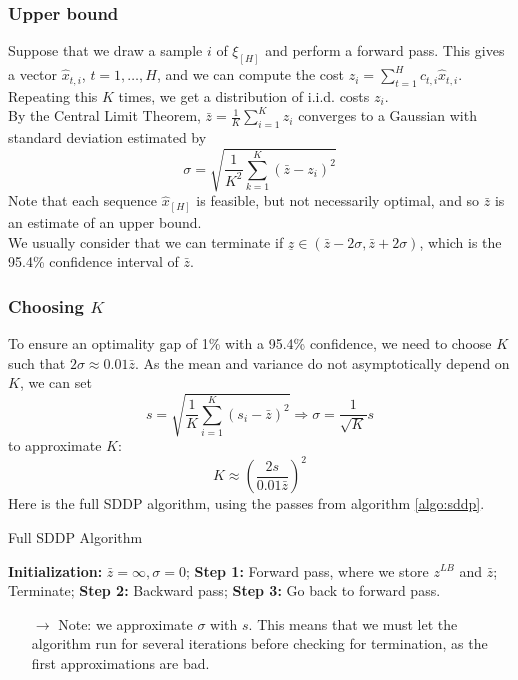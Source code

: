 \documentclass[12pt, openany]{report}
\theoremstyle{definition}
\begin{document}
\subsubsection{Upper bound}
Suppose that we draw a sample $i$ of $\xi_{[H]}$ and perform a forward pass. This gives a vector $\hat x_{t,i}$, $t=1,\dots,H$, and we can compute the cost $z_i = \sum_{t=1}^{H} c_{t,i}\hat x_{t,i}$. Repeating this $K$ times, we get a distribution of i.i.d. costs $z_i$.\\
By the Central Limit Theorem, $\bar z = \frac{1}{K}\sum_{i=1}^Kz_i$ converges to a Gaussian with standard deviation estimated by 
\begin{equation}
	\sigma = \sqrt{\frac{1}{K^2} \sum_{k=1}^K (\bar z-z_i)^2}
\end{equation}
Note that each sequence $\hat x_{[H]}$ is feasible, but not necessarily optimal, and so $\bar z$ is an estimate of an upper bound. \\

We usually consider that we can terminate if $\underline{z}\in (\bar z-2\sigma, \bar z+2\sigma)$, which is the 95.4\% confidence interval of $\bar z$. 
\subsubsection{Choosing \texorpdfstring{$K$}{}}
To ensure an optimality gap of 1\% with a 95.4\% confidence, we need to choose $K$ such that $2\sigma \approx 0.01\bar z$. As the mean and variance do not asymptotically depend on $K$, we can set
\begin{equation}
	s=\sqrt{\frac{1}{K}\sum_{i=1}^K(s_i-\bar z)^2} \Rightarrow \sigma = \frac{1}{\sqrt{K}}s
\end{equation}
to approximate $K$:
\begin{equation}
	K \approx \left(\frac{2s}{0.01\bar z}\right)^2
\end{equation}
Here is the full SDDP algorithm, using the passes from algorithm \ref{algo:sddp}.
\begin{algorithm}[H]
	\caption{Full SDDP Algorithm}
	\label{algo:full_sddp}
	\begin{algorithmic}[1]
		\State \textbf{Initialization: } $\bar z= \infty, \sigma=0$;
		\State \textbf{Step 1: }Forward pass, where we store $z^{LB}$ and $\bar z$;
		\State Terminate;
		\EndIf 
		\State \textbf{Step 2: } Backward pass;
		\State \textbf{Step 3: } Go back to forward pass.
	\end{algorithmic}
\end{algorithm}
\begin{itemize}
	\item [$\to$] Note: we approximate $\sigma$ with $s$. This means that we must let the algorithm run for several iterations before checking for termination, as the first approximations are bad.
\end{itemize}
\end{document}

